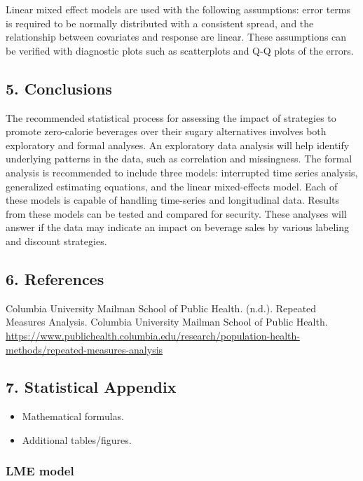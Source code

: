 \documentclass[
]{article}
\providecommand{\tightlist}{%
  \setlength{\itemsep}{0pt}\setlength{\parskip}{0pt}}
\begin{document}
Linear mixed effect models are used with the following assumptions:
error terms is required to be normally distributed with a consistent
spread, and the relationship between covariates and response are linear.
These assumptions can be verified with diagnostic plots such as
scatterplots and Q-Q plots of the errors.

\hypertarget{conclusions}{%
\subsection{5. Conclusions}\label{conclusions}}

The recommended statistical process for assessing the impact of
strategies to promote zero-calorie beverages over their sugary
alternatives involves both exploratory and formal analyses. An
exploratory data analysis will help identify underlying patterns in the
data, such as correlation and missingness. The formal analysis is
recommended to include three models: interrupted time series analysis,
generalized estimating equations, and the linear mixed-effects model.
Each of these models is capable of handling time-series and longitudinal
data. Results from these models can be tested and compared for security.
These analyses will answer if the data may indicate an impact on
beverage sales by various labeling and discount strategies.

\hypertarget{references}{%
\subsection{6. References}\label{references}}

Columbia University Mailman School of Public Health. (n.d.). Repeated
Measures Analysis. Columbia University Mailman School of Public Health.
\url{https://www.publichealth.columbia.edu/research/population-health-methods/repeated-measures-analysis}

\hypertarget{statistical-appendix}{%
\subsection{7. Statistical Appendix}\label{statistical-appendix}}

\begin{itemize}
\tightlist
\item
  Mathematical formulas.
\item
  Additional tables/figures.
\end{itemize}

\hypertarget{lme-model}{%
\subsubsection{LME model}\label{lme-model}}
\end{document}
